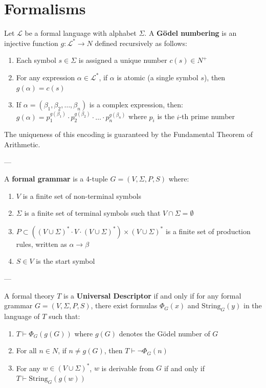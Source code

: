 \documentclass[runningheads]{llncs}
\begin{document}
\section{Formalisms}

\begin{definition}
	Let $\mathcal{L}$ be a formal language with alphabet $\Sigma$. A \textbf{Gödel numbering} is an injective function $g: \mathcal{L}^* \rightarrow N$ defined recursively as follows:
	\begin{enumerate}
		\item Each symbol $s \in \Sigma$ is assigned a unique number $c(s) \in N^+$
		\item For any expression $\alpha \in \mathcal{L}^*$, if $\alpha$ is atomic (a single symbol $s$), then $g(\alpha) = c(s)$
		\item If $\alpha = (\beta_1, \beta_2, \ldots, \beta_n)$ is a complex expression, then:
		$g(\alpha) = p_1^{g(\beta_1)} \cdot p_2^{g(\beta_2)} \cdot \ldots \cdot p_n^{g(\beta_n)}$
		where $p_i$ is the $i$-th prime number
	\end{enumerate}
	The uniqueness of this encoding is guaranteed by the Fundamental Theorem of Arithmetic.
\end{definition}

---

\begin{definition}
	A \textbf{formal grammar} is a 4-tuple $G = (V, \Sigma, P, S)$ where:
	\begin{enumerate}
		\item $V$ is a finite set of non-terminal symbols
		\item $\Sigma$ is a finite set of terminal symbols such that $V \cap \Sigma = \emptyset$
		\item $P \subset ((V \cup \Sigma)^* \cdot V \cdot (V \cup \Sigma)^*) \times (V \cup \Sigma)^*$ is a finite set of production rules, written as $\alpha \rightarrow \beta$
		\item $S \in V$ is the start symbol
	\end{enumerate}
\end{definition}

---

\begin{definition}
	A formal theory $T$ is a \textbf{Universal Descriptor} if and only if for any formal grammar $G = (V, \Sigma, P, S)$, there exist formulas $\Phi_G(x)$ and $\text{String}_G(y)$ in the language of $T$ such that:
	\begin{enumerate}
		\item $T \vdash \Phi_G(g(G))$ where $g(G)$ denotes the Gödel number of $G$
		\item For all $n \in N$, if $n \neq g(G)$, then $T \vdash \neg\Phi_G(n)$
		\item For any $w \in (V \cup \Sigma)^*$, $w$ is derivable from $G$ if and only if $T \vdash \text{String}_G(g(w))$
	\end{enumerate}
\end{definition}
\end{document}
